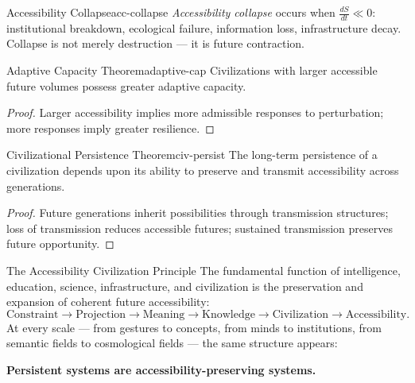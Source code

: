 \begin{definition}{Accessibility Collapse}{acc-collapse}
  \emph{Accessibility collapse} occurs when $\frac{dS}{dt} \ll 0$:
  institutional breakdown, ecological failure, information loss,
  infrastructure decay. Collapse is not merely destruction —
  it is future contraction.
\end{definition}

\begin{theorem}{Adaptive Capacity Theorem}{adaptive-cap}
  Civilizations with larger accessible future volumes possess greater
  adaptive capacity.
\end{theorem}
\begin{proof}
  Larger accessibility implies more admissible responses to perturbation;
  more responses imply greater resilience.
\end{proof}

\begin{theorem}{Civilizational Persistence Theorem}{civ-persist}
  The long-term persistence of a civilization depends upon its ability
  to preserve and transmit accessibility across generations.
\end{theorem}
\begin{proof}
  Future generations inherit possibilities through transmission structures;
  loss of transmission reduces accessible futures; sustained transmission
  preserves future opportunity.
\end{proof}

\begin{namedthm}{The Accessibility Civilization Principle}
  The fundamental function of intelligence, education, science,
  infrastructure, and civilization is the preservation and expansion
  of coherent future accessibility:
  \[
    \text{Constraint} \to \text{Projection} \to \text{Meaning}
    \to \text{Knowledge} \to \text{Civilization} \to \text{Accessibility.}
  \]
  At every scale — from gestures to concepts, from minds to institutions,
  from semantic fields to cosmological fields — the same structure appears:
  \begin{center}
    \textbf{Persistent systems are accessibility-preserving systems.}
  \end{center}
\end{namedthm}
